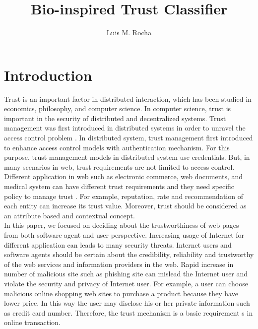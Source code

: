 \documentclass{llncs}
\begin{document}
\title{Bio-inspired Trust Classifier}
\author{Luis M. Rocha}

%
%
\maketitle

\section{Introduction}

Trust is an important factor in  distributed interaction, which has been studied in economics, philosophy, and computer science.  In computer science, trust is important in the security of distributed and decentralized systems.  Trust management was first introduced in distributed systems in order to unravel the access control problem \cite{blaze}. In distributed system, trust management first introduced to enhance access control models with authentication mechanism. For this purpose, trust management models in distributed system use credentials. But, in many scenarios in  web, trust requirements are not limited to access control. Different application in web such as electronic commerce, web documents, and medical system can have different trust requirements and they need specific policy to  manage trust \cite{surveyInternt}. For example, reputation, rate and recommendation of each entity can  increase its trust value. Moreover, trust should be considered as an attribute based and contextual concept.\\

In this paper, we focused on deciding about the trustworthiness of web pages from both software agent and user perspective. Increasing usage of Internet for different application can leads to many security threats. Internet users and software agents should be certain about the credibility, reliability and trustworthy of the web services and information providers in the web.  Rapid increase in number of malicious site such as phishing site can mislead the Internet user and  violate the security and privacy of Internet user.  For example, a user can choose malicious online shopping web sites to purchase a product because they have lower price. In this way the user may disclose his or her private information such as credit card number. Therefore, the trust  mechanism is a basic requirement s in online transaction. \\
\end{document}
